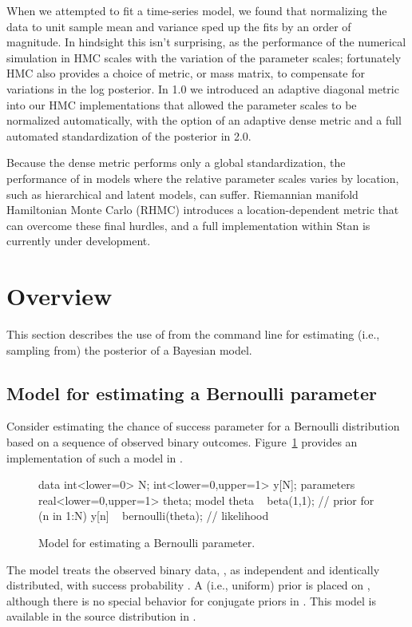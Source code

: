 \documentclass[article]{jss}
\begin{document}
When we attempted to fit a time-series model, we found that
normalizing the data to unit sample mean and variance sped up the fits
by an order of magnitude.  In hindsight this isn't surprising, as the 
performance of the numerical simulation in HMC scales with the variation 
of the parameter scales; fortunately HMC also provides a choice of metric,
or mass matrix, to compensate for variations in the log posterior.
In  1.0 we introduced an adaptive 
diagonal metric into our HMC implementations that allowed the parameter 
scales to be normalized automatically, with the option of an adaptive dense 
metric and a full automated standardization of the posterior in  2.0.

Because the dense metric performs only a global standardization, the
performance of  in models where the relative parameter
scales varies by location, such as hierarchical and latent models, can
suffer.  Riemannian manifold Hamiltonian Monte Carlo (RHMC)
\citep{GirolamiCalderhead:2011} introduces a location-dependent metric
that can overcome these final hurdles, and a full implementation
within Stan is currently under development.

\section{Overview}

This section describes the use of  from the command
line for estimating (i.e., sampling from) the posterior of a Bayesian
model.

\subsection{Model for estimating a Bernoulli parameter}

Consider estimating the chance of success parameter for a Bernoulli
distribution based on a sequence of observed binary outcomes.  
Figure~\ref{bernoulli-model.fig} provides an implementation of such a
model in .
%
\begin{figure}
\begin{Code}
data { 
  int<lower=0> N; 
  int<lower=0,upper=1> y[N];
} 
parameters {
  real<lower=0,upper=1> theta;
} 
model {
  theta ~ beta(1,1);  // prior
  for (n in 1:N) 
    y[n] ~ bernoulli(theta);  // likelihood
}
\end{Code}
\caption{Model for estimating a Bernoulli parameter.}\label{bernoulli-model.fig}
\end{figure}
%
The model treats the observed binary data, , as
independent and identically distributed, with success probability .  
A  (i.e., uniform) prior is placed on  , although there is no
special behavior for conjugate priors in .  This model
is available in the  source distribution in
.
\end{document}
